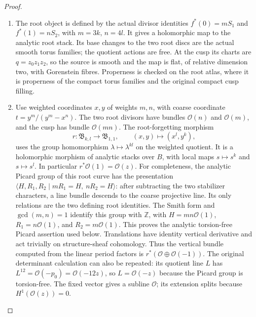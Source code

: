 \begin{proof}
\begin{enumerate}[label=\arabic*.,leftmargin=*]
\item The root object is defined by the actual divisor identities
$f^*(0)=mS_1$ and $f^*(1)=nS_2$, with $m=3k$, $n=4l$.
It gives a holomorphic map to the analytic root stack.  Its base
changes to the two root discs are the actual smooth torus
families; the quotient actions are free.  At the cusp its charts
are $q=z_0z_1z_2$, so the source is smooth and the map is flat,
of relative dimension two, with Gorenstein fibres.  Properness is
checked on the root atlas, where it is properness of the compact
torus families and the original compact cusp filling.

\item Use weighted coordinates $x,y$ of weights $m,n$, with coarse
coordinate $t=y^m/(y^m-x^n)$.
The two root divisors have bundles $\mathcal O(n)$ and
$\mathcal O(m)$, and the cusp has bundle $\mathcal O(mn)$.
The root-forgetting morphism
\[
 r:\mathfrak B_{k,l}\longrightarrow\mathfrak B_{1,1},
 \qquad (x,y)\longmapsto(x^l,y^k),
\]
uses the group homomorphism $\lambda\mapsto\lambda^{kl}$ on
the weighted quotient.  It is a holomorphic morphism of analytic
stacks over $B$, with local maps $s\mapsto s^k$ and
$s\mapsto s^l$.  In particular $r^*\mathcal O(1)=\mathcal O(z)$.
For completeness, the analytic Picard group of this root curve has
the presentation
$\langle H,R_1,R_2\mid mR_1=H,\ nR_2=H\rangle$:
after subtracting the two stabilizer characters, a line bundle
descends to the coarse projective line.  Its only relations are
the two defining root identities.  The Smith form and
$\gcd(m,n)=1$ identify this group with $\mathbb Z$, with
$H=mn\mathcal O(1)$, $R_1=n\mathcal O(1)$, and
$R_2=m\mathcal O(1)$.  This proves the analytic torsion-free
Picard assertion used below.
Translations have identity vertical derivative and act trivially
on structure-sheaf cohomology.  Thus the vertical bundle computed
from the linear period factors is $r^*(\mathcal O\oplus
\mathcal O(-1))$.  The original determinant calculation can also
be repeated: its quotient line $L$ has
$L^{12}=\mathcal O(-p_0)=\mathcal O(-12z)$, so
$L=\mathcal O(-z)$ because the Picard group is torsion-free.
The fixed vector gives a subline $\mathcal O$; its extension
splits because $H^1(\mathcal O(z))=0$.


\end{enumerate}
\end{proof}
